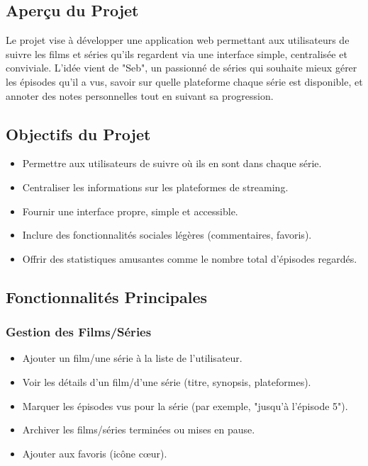 \subsection{Aperçu du Projet}
Le projet vise à développer une application web permettant aux utilisateurs de suivre les films et séries qu'ils regardent via une interface simple, centralisée et conviviale. L'idée vient de "Seb", un passionné de séries qui souhaite mieux gérer les épisodes qu'il a vus, savoir sur quelle plateforme chaque série est disponible, et annoter des notes personnelles tout en suivant sa progression.

\subsection{Objectifs du Projet}
\begin{itemize}
    \item Permettre aux utilisateurs de suivre où ils en sont dans chaque série.
    \item Centraliser les informations sur les plateformes de streaming.
    \item Fournir une interface propre, simple et accessible.
    \item Inclure des fonctionnalités sociales légères (commentaires, favoris).
    \item Offrir des statistiques amusantes comme le nombre total d'épisodes regardés.
\end{itemize}

\subsection{Fonctionnalités Principales}

\subsubsection{Gestion des Films/Séries}
\begin{itemize}
    \item Ajouter un film/une série à la liste de l'utilisateur.
    \item Voir les détails d'un film/d'une série (titre, synopsis, plateformes).
    \item Marquer les épisodes vus pour la série (par exemple, "jusqu'à l'épisode 5").
    \item Archiver les films/séries terminées ou mises en pause.
    \item Ajouter aux favoris (icône cœur).
\end{itemize}

